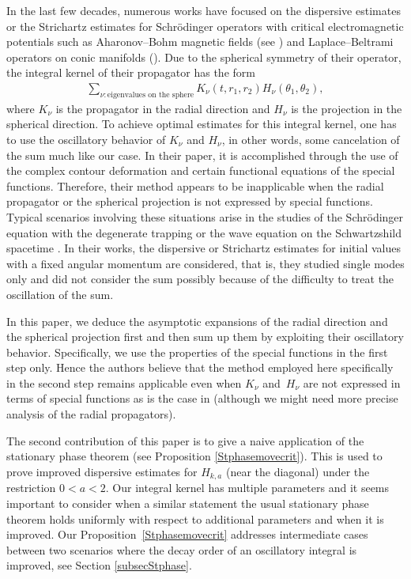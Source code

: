 \documentclass[10pt,a4paper]{article}
\numberwithin{equation}{section}
\def\n{\nu}
\begin{document}
In the last few decades, numerous works have focused on the dispersive estimates or the Strichartz estimates for Schr\"odinger operators with critical electromagnetic potentials such as Aharonov--Bohm magnetic fields (see \cite{FFFP1,FFFP2,FZZ,GYZZ}) and Laplace--Beltrami operators on conic manifolds (\cite{F,ZZ}). Due to the spherical symmetry of their operator, the integral kernel of their propagator has the form
\begin{align*}
\sum_{\n\colon \text{eigenvalues on the sphere}}K_{\n}(t,r_1,r_2)H_{\n}(\theta_1,\theta_2),
\end{align*}
where $K_{\n}$ is the propagator in the radial direction and $H_{\n}$ is the projection in the spherical direction. To achieve optimal estimates for this integral kernel, one has to use the oscillatory behavior of $K_{\n}$ and $H_{\n}$, in other words, some cancelation of the sum much like our case. In their paper, it is accomplished through the use of the complex contour deformation and certain functional equations of the special functions.
Therefore, their method appears to be inapplicable when the radial propagator or the spherical projection is not expressed by special functions. Typical scenarios involving these situations arise in the studies of the Schr\"odinger equation with the degenerate trapping \cite{C} or the wave equation on the Schwartzshild spacetime \cite{DSS}. In their works, the dispersive or Strichartz estimates for initial values with a fixed angular momentum are considered, that is, they studied single modes only and did not consider the sum possibly because of the difficulty to treat the oscillation of the sum.

In this paper, we deduce the asymptotic expansions of the radial direction and the spherical projection first and then sum up them by exploiting their oscillatory behavior. Specifically, we use the properties of the special functions in the first step only. Hence the authors believe that the method employed here specifically in the second step remains applicable even when $K_{\n}$ and~$H_{\n}$ are not expressed in terms of special functions as is the case in \cite{C,DSS} (although we might need more precise analysis of the radial propagators).

The second contribution of this paper is to give a naive application of the stationary phase theorem (see Proposition \ref{Stphasemovecrit}). This is used to prove improved dispersive estimates for $H_{k,a}$ (near the diagonal) under the restriction $0<a<2$. Our integral kernel has multiple parameters and it seems important to consider when a similar statement the usual stationary phase theorem holds uniformly with respect to additional parameters and when it is improved. Our Proposition~\ref{Stphasemovecrit} addresses intermediate cases between two scenarios where the decay order of an oscillatory integral is improved, see Section \ref{subsecStphase}.
\end{document}

